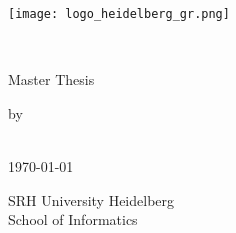 \begin{titlepage}
\begin{flushright}
\texttt{[image: logo\_heidelberg\_gr.png]}
\end{flushright}
\vspace{4em}
\begin{center}



\begin{LARGE}
\textbf{\Title}
\end{LARGE}\\


\vspace{4em}



{\LARGE Master Thesis}\\


\vspace{1em}

{\LARGE by}\\

\vspace{1em}
\LARGE{\textbf{\Student}}\\


\vspace{1em}

{\large {\mydate\today}}\\%

\vspace{6em}

{\large SRH University Heidelberg}\\
{\large School of Informatics}\\

\vspace{2em}

\end{center}
 \hspace{\fill}\makebox{\PrimarySupervisor}\\
 \hspace{\fill} \makebox{\SecondarySupervisor}

\vspace*{\fill}
\end{titlepage}
